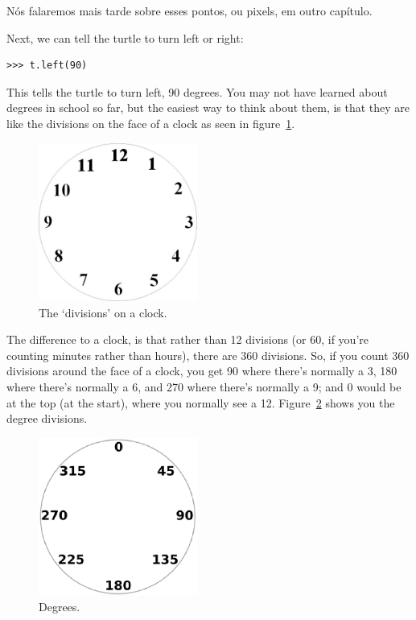 Nós falaremos mais tarde sobre esses pontos, ou pixels, em outro capítulo.

Next, we can tell the turtle to turn left or right:

\begin{listing}
\begin{verbatim}
>>> t.left(90)
\end{verbatim}
\end{listing}

This tells the turtle to turn left, 90 degrees.  You may not have learned about degrees in school so far, but the easiest way to think about them, is that they are like the divisions on the face of a clock as seen in figure~\ref{fig13}.

\begin{figure}
\begin{center}
\includegraphics[width=52mm]{eps/figure13.eps}
\end{center}
\caption{The `divisions' on a clock.}\label{fig13}
\end{figure}

The difference to a clock, is that rather than 12 divisions (or 60, if you're counting minutes rather than hours), there are 360 divisions.  So, if you count 360 divisions around the face of a clock, you get 90 where there's normally a 3, 180 where there's normally a 6, and 270 where there's normally a 9; and 0 would be at the top (at the start), where you normally see a 12.  Figure~\ref{fig14} shows you the degree divisions.

\begin{figure}
\begin{center}
\includegraphics[width=52mm]{eps/figure14.eps}
\end{center}
\caption{Degrees.}\label{fig14}
\end{figure}

